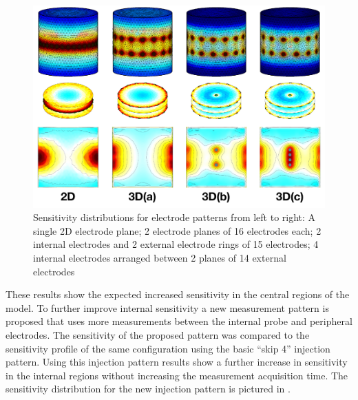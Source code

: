 \begin{figure}[H]
\centering
\includegraphics[width=\textwidth]{chapter6-internal_electrodes/imgs/Sensitivity_Comparison_new.pdf}
\caption[Sensitivity with different internal electrode configurations]{Sensitivity distributions for electrode patterns from left to right: A single 2D electrode plane; 2 electrode planes of 16 electrodes 
each; 2 internal electrodes and 2 external electrode rings of 15 electrodes; 4 internal electrodes arranged between 2 planes of 14 external
electrodes}
\label{fig:internal_sensitivity}
\end{figure}

These results show the expected increased sensitivity in the central regions of the model. 
To further improve internal sensitivity a new
measurement pattern is proposed that uses more measurements between the 
internal probe and peripheral electrodes. 
The sensitivity of the proposed pattern was compared to the sensitivity profile 
of the same configuration using 
the basic ``skip 4'' injection pattern.
Using this injection pattern results show a further increase in sensitivity 
in the internal regions without increasing the measurement
acquisition time. The sensitivity distribution for the new injection pattern 
is pictured in .

